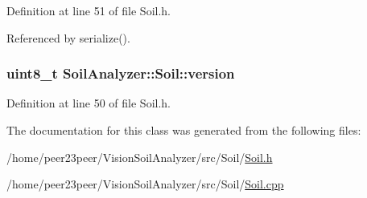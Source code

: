 Definition at line 51 of file Soil.\+h.



Referenced by serialize().

\hypertarget{class_soil_analyzer_1_1_soil_ac32132912c73338edf60b5cd6de4feb8}{}
\subsubsection[{version}]{\setlength{\rightskip}{0pt plus 5cm}uint8\+\_\+t Soil\+Analyzer\+::\+Soil\+::version}\label{class_soil_analyzer_1_1_soil_ac32132912c73338edf60b5cd6de4feb8}


Definition at line 50 of file Soil.\+h.



The documentation for this class was generated from the following files\+:\begin{DoxyCompactItemize}
\item 
/home/peer23peer/\+Vision\+Soil\+Analyzer/src/\+Soil/\hyperlink{_soil_8h}{Soil.\+h}\item 
/home/peer23peer/\+Vision\+Soil\+Analyzer/src/\+Soil/\hyperlink{_soil_8cpp}{Soil.\+cpp}\end{DoxyCompactItemize}
